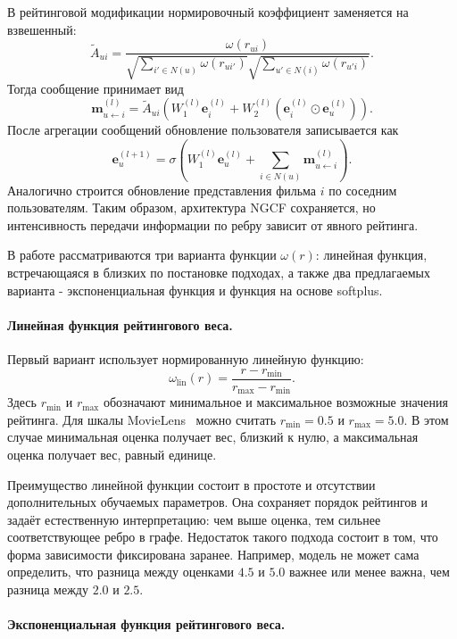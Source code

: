 \documentclass[12pt,fleqn]{article}
\begin{document}
В рейтинговой модификации нормировочный коэффициент заменяется на
взвешенный:
$$
    \widetilde A_{ui}
    =
    \frac{
        \omega(r_{ui})
    }{
        \sqrt{
            \sum\limits_{i'\in N(u)}
            \omega(r_{ui'})
        }
        \sqrt{
            \sum\limits_{u'\in N(i)}
            \omega(r_{u'i})
        }
    }.
$$
Тогда сообщение принимает вид
$$
    \mathbf{m}^{(l)}_{u\leftarrow i}
    =
    \widetilde A_{ui}
    \left(
        W_1^{(l)}\mathbf{e}^{(l)}_i
        +
        W_2^{(l)}
        \left(
            \mathbf{e}^{(l)}_i\odot \mathbf{e}^{(l)}_u
        \right)
    \right).
$$
После агрегации сообщений обновление пользователя записывается как
$$
    \mathbf{e}^{(l+1)}_u
    =
    \sigma
    \left(
        W_1^{(l)}\mathbf{e}^{(l)}_u
        +
        \sum_{i\in N(u)}
        \mathbf{m}^{(l)}_{u\leftarrow i}
    \right).
$$
Аналогично строится обновление представления фильма $i$ по соседним
пользователям. Таким образом, архитектура NGCF сохраняется, но интенсивность
передачи информации по ребру зависит от явного рейтинга.

В работе рассматриваются три варианта функции $\omega(r)$: линейная функция, встречающаяся в близких по постановке подходах, а также два предлагаемых варианта - экспоненциальная функция и функция на основе softplus.

\paragraph{Линейная функция рейтингового веса.}

Первый вариант использует нормированную линейную функцию:
$$
    \omega_{\mathrm{lin}}(r)
    =
    \frac{r-r_{\min}}{r_{\max}-r_{\min}}.
$$
Здесь $r_{\min}$ и $r_{\max}$ обозначают минимальное и максимальное возможные значения
рейтинга. Для шкалы MovieLens~\cite{harper2015movielens} можно считать $r_{\min}=0.5$ и $r_{\max}=5.0$.
В этом случае минимальная оценка получает вес, близкий к нулю, а максимальная
оценка получает вес, равный единице.

Преимущество линейной функции состоит в простоте и отсутствии дополнительных
обучаемых параметров. Она сохраняет порядок рейтингов и задаёт естественную
интерпретацию: чем выше оценка, тем сильнее соответствующее ребро в графе.
Недостаток такого подхода состоит в том, что форма зависимости фиксирована
заранее. Например, модель не может сама определить, что разница между оценками
$4.5$ и $5.0$ важнее или менее важна, чем разница между $2.0$ и $2.5$.

\paragraph{Экспоненциальная функция рейтингового веса.}
\end{document}
